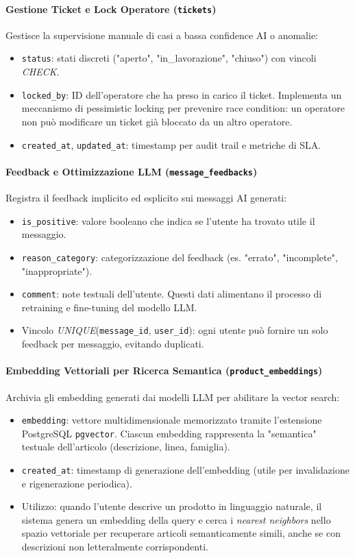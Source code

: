 \documentclass[a4paper, 11pt, oneside]{scrartcl}
\begin{document}
\paragraph{Gestione Ticket e Lock Operatore (\texttt{tickets})}
Gestisce la supervisione manuale di casi a bassa confidence AI o anomalie:
\begin{itemize}
    \item \texttt{status}: stati discreti ("aperto", "in\_lavorazione", "chiuso") con vincoli \textit{CHECK}.
    \item \texttt{locked\_by}: ID dell'operatore che ha preso in carico il ticket. Implementa un meccanismo di pessimistic locking per prevenire race condition: un operatore non può modificare un ticket già bloccato da un altro operatore.
    \item \texttt{created\_at}, \texttt{updated\_at}: timestamp per audit trail e metriche di SLA.
\end{itemize}

\paragraph{Feedback e Ottimizzazione LLM (\texttt{message\_feedbacks})}
Registra il feedback implicito ed esplicito sui messaggi AI generati:
\begin{itemize}
    \item \texttt{is\_positive}: valore booleano che indica se l'utente ha trovato utile il messaggio.
    \item \texttt{reason\_category}: categorizzazione del feedback (es. "errato", "incomplete", "inappropriate").
    \item \texttt{comment}: note testuali dell'utente. Questi dati alimentano il processo di retraining e fine-tuning del modello LLM.
    \item Vincolo \textit{UNIQUE}(\texttt{message\_id}, \texttt{user\_id}): ogni utente può fornire un solo feedback per messaggio, evitando duplicati.
\end{itemize}

\paragraph{Embedding Vettoriali per Ricerca Semantica (\texttt{product\_embeddings})}
Archivia gli embedding generati dai modelli LLM per abilitare la vector search:
\begin{itemize}
    \item \texttt{embedding}: vettore multidimensionale memorizzato tramite l'estensione PostgreSQL \texttt{pgvector}. Ciascun embedding rappresenta la "semantica" testuale dell'articolo (descrizione, linea, famiglia).
    \item \texttt{created\_at}: timestamp di generazione dell'embedding (utile per invalidazione e rigenerazione periodica).
    \item Utilizzo: quando l'utente descrive un prodotto in linguaggio naturale, il sistema genera un embedding della query e cerca i \textit{nearest neighbors} nello spazio vettoriale per recuperare articoli semanticamente simili, anche se con descrizioni non letteralmente corrispondenti.
\end{itemize}
\end{document}
